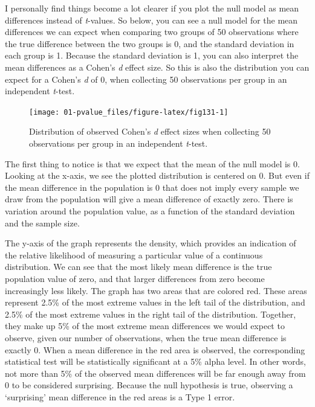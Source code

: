 \documentclass[
  oneside]{krantz}
\begin{document}
I personally find things become a lot clearer if you plot the null model as mean differences instead of \emph{t}-values. So below, you can see a null model for the mean differences we can expect when comparing two groups of 50 observations where the true difference between the two groups is 0, and the standard deviation in each group is 1. Because the standard deviation is 1, you can also interpret the mean differences as a Cohen's \emph{d} effect size. So this is also the distribution you can expect for a Cohen's \emph{d} of 0, when collecting 50 observations per group in an independent \emph{t}-test.



\begin{figure}

{\centering \texttt{[image: 01-pvalue\_files/figure-latex/fig131-1]} 

}

\caption{Distribution of observed Cohen's \emph{d} effect sizes when collecting 50 observations per group in an independent \emph{t}-test.}\label{fig:fig131}
\end{figure}

The first thing to notice is that we expect that the mean of the null model is 0. Looking at the x-axis, we see the plotted distribution is centered on 0. But even if the mean difference in the population is 0 that does not imply every sample we draw from the population will give a mean difference of exactly zero. There is variation around the population value, as a function of the standard deviation and the sample size.

The y-axis of the graph represents the density, which provides an indication of the relative likelihood of measuring a particular value of a continuous distribution. We can see that the most likely mean difference is the true population value of zero, and that larger differences from zero become increasingly less likely. The graph has two areas that are colored red. These areas represent 2.5\% of the most extreme values in the left tail of the distribution, and 2.5\% of the most extreme values in the right tail of the distribution. Together, they make up 5\% of the most extreme mean differences we would expect to observe, given our number of observations, when the true mean difference is exactly 0. When a mean difference in the red area is observed, the corresponding statistical test will be statistically significant at a 5\% alpha level. In other words, not more than 5\% of the observed mean differences will be far enough away from 0 to be considered surprising. Because the null hypothesis is true, observing a `surprising' mean difference in the red areas is a Type 1 error.
\end{document}
